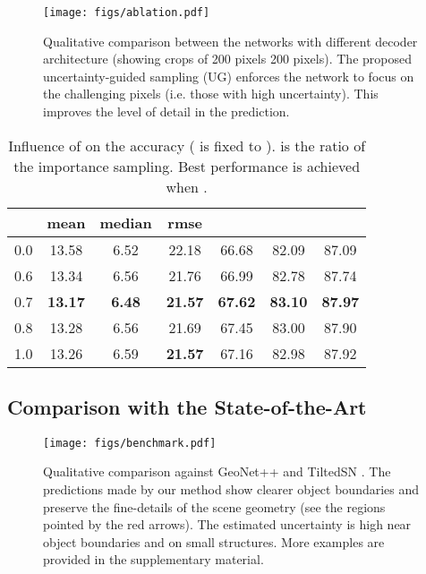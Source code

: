 \documentclass[10pt,twocolumn,letterpaper]{article}
\begin{document}
\begin{figure}[t]
\begin{center}
\texttt{[image: figs/ablation.pdf]}
\end{center}
\caption{Qualitative comparison between the networks with different decoder architecture (showing crops of 200 pixels  200 pixels). The proposed uncertainty-guided sampling (UG) enforces the network to focus on the challenging pixels (i.e. those with high uncertainty). This improves the level of detail in the prediction.}
\label{fig:ablation1}
\end{figure}


\begin{table}[t]
\setlength\tabcolsep{1.5pt}
\begin{center}
\begin{tabular}{c|ccc|ccc}
\hline
\toprule
 & mean & median & rmse &  &  &  \\
\midrule
0.0 & 13.58 & 6.52 & 22.18 & 66.68 & 82.09 & 87.09 \\
0.6 & 13.34 & 6.56 & 21.76 & 66.99 & 82.78 & 87.74 \\
0.7 & \textbf{13.17} & \textbf{6.48} & \textbf{21.57} & \textbf{67.62} & \textbf{83.10} & \textbf{87.97} \\
0.8 & 13.28 & 6.56 & 21.69 & 67.45 & 83.00 & 87.90 \\
1.0 & 13.26 & 6.59 & \textbf{21.57} & 67.16 & 82.98 & 87.92 \\
\bottomrule
\end{tabular}
\end{center}
\caption{Influence of  on the accuracy ( is fixed to ).  is the ratio of the importance sampling. Best performance is achieved when .}
\label{table:ablation_beta}
\end{table}

\subsection{Comparison with the State-of-the-Art}

\begin{figure*}[t]
\begin{center}
\texttt{[image: figs/benchmark.pdf]}
\end{center}
\caption{Qualitative comparison against GeoNet++ \cite{SNfromRGB_20_GeoNet++} and TiltedSN \cite{SNfromRGB_20_TiltedSN}. The predictions made by our method show clearer object boundaries and preserve the fine-details of the scene geometry (see the regions pointed by the red arrows). The estimated uncertainty is high near object boundaries and on small structures. More examples are provided in the supplementary material.}
\label{fig:bm}
\end{figure*}
\end{document}
